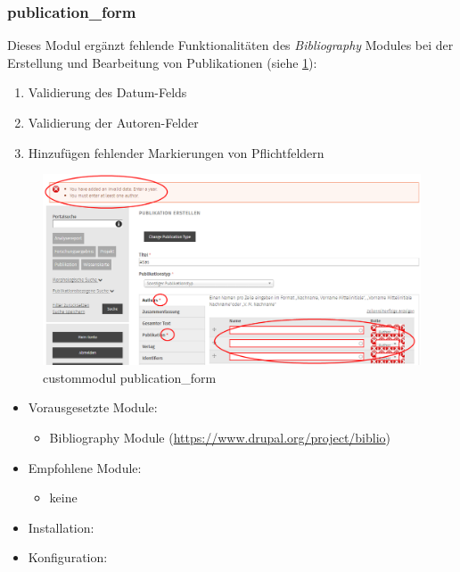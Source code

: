 \subsubsection{publication\_form}\label{subsub:publicationform}
Dieses Modul ergänzt fehlende Funktionalitäten des \textit{Bibliography} Modules bei der Erstellung und Bearbeitung von Publikationen (siehe \cref{fig:example_publicationform}):
\begin{enumerate}
	\item Validierung des Datum-Felds
	\item Validierung der Autoren-Felder
	\item Hinzufügen fehlender Markierungen von Pflichtfeldern
\end{enumerate}

\begin{figure}[H]
	\centering
	\includegraphics[height=0.20\textheight]{images/example_publicationform}
	\caption{\gls{custommodul} publication\_form}
	\label{fig:example_publicationform}
\end{figure}

\begin{itemize}[parsep=0pt, itemsep=5.0pt plus 2.0pt minus 1.0pt, leftmargin=*]
	\item Vorausgesetzte Module:
	\begin{itemize}
		\item Bibliography Module (\url{https://www.drupal.org/project/biblio})
	\end{itemize}

	\item Empfohlene Module:
	\begin{itemize}
		\item keine
	\end{itemize}

	\item Installation: \standardinstall

	\item Konfiguration:

	\noconfig


\end{itemize}


